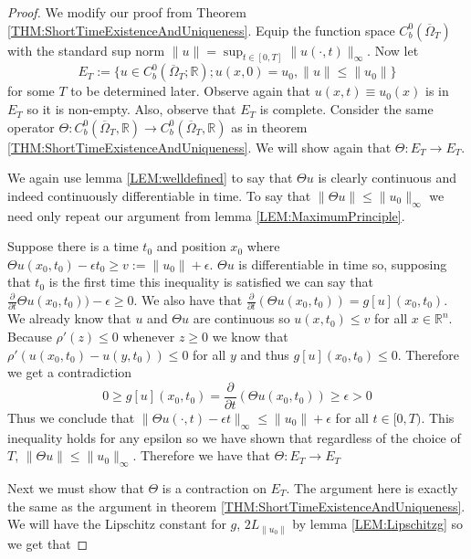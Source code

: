 \documentclass[aps,
preprint,
groupedaddress,
showkeys,
amsmath]{revtex4-2}
\begin{document}
    \begin{proof}
        We modify our proof from Theorem \ref{THM:ShortTimeExistenceAndUniqueness}. Equip the function space $C_b^0(\overline{\Omega}_T)$ with the standard sup norm $\|u\|=\sup_{t\in [0,T]}\|u(\cdot ,t)\|_\infty$. Now let \[E_{T}:=\{u\in C_b^0(\overline{\Omega}_T;\mathbb{R});u(x,0)=u_0,\|u\|\leq \|u_0\|\}\] for some $T$ to be determined later. Observe again that $u(x,t)\equiv u_0(x)$ is in $E_{T}$ so it is non-empty. Also, observe that $E_{T}$ is complete. Consider the same operator $\Theta:C_b^0(\overline{\Omega}_T,\mathbb{R})\rightarrow C_b^0(\overline{\Omega}_T,\mathbb{R})$ as in theorem \ref{THM:ShortTimeExistenceAndUniqueness}. We will show again that $\Theta:E_{T}\rightarrow E_{T}$.

        We again use lemma \ref{LEM:welldefined} to say that $\Theta u$ is clearly continuous and indeed continuously differentiable in time. 
        To say that $\|\Theta u\|\leq \|u_0\|_\infty$ we need only repeat our argument from lemma \ref{LEM:MaximumPrinciple}.

        Suppose there is a time $t_0$ and position $x_0$ where $\Theta u(x_0,t_0)-\epsilon t_0\geq  v:=\|u_0\|+\epsilon$. $\Theta u$ is differentiable in time so, supposing that $t_0$ is the first time this inequality is satisfied we can say that $\frac{\partial}{\partial t}\Theta u(x_0,t_0))-\epsilon\geq 0$. We also have that $\frac{\partial}{\partial t}(\Theta u (x_0,t_0))=g[u](x_0,t_0)$. We already know that $u$ and $\Theta u$ are continuous so $u(x,t_0)\leq v$ for all $x\in \mathbb{R}^n$. Because $\rho'(z)\leq 0$ whenever $z\geq 0$ we know that $\rho'(u(x_0,t_0)-u(y,t_0))\leq 0$ for all $y$ and thus $g[u](x_0,t_0)\leq 0$. Therefore we get a contradiction 
        \begin{equation*}
            0\geq g[u](x_0,t_0)=\frac{\partial}{\partial t}(\Theta u (x_0,t_0))\geq \epsilon >0
        \end{equation*}
        Thus we conclude that $\|\Theta u(\cdot,t)-\epsilon t\|_\infty\leq \|u_0\|+\epsilon$ for all $t\in [0,T)$.  This inequality holds for any epsilon so we have shown that regardless of the choice of $T$, $\|\Theta u\|\leq \|u_0\|_\infty$.
        Therefore we have that $\Theta: E_{T}\rightarrow E_{T}$ 

        Next we must show that $\Theta$ is a contraction on $E_{T}$. The argument here is exactly the same as the argument in theorem \ref{THM:ShortTimeExistenceAndUniqueness}. We will have the Lipschitz constant for $g$, $2L_{\|u_0\|}$ by lemma \ref{LEM:Lipschitzg} so we get that
        

\end{proof}
\end{document}
